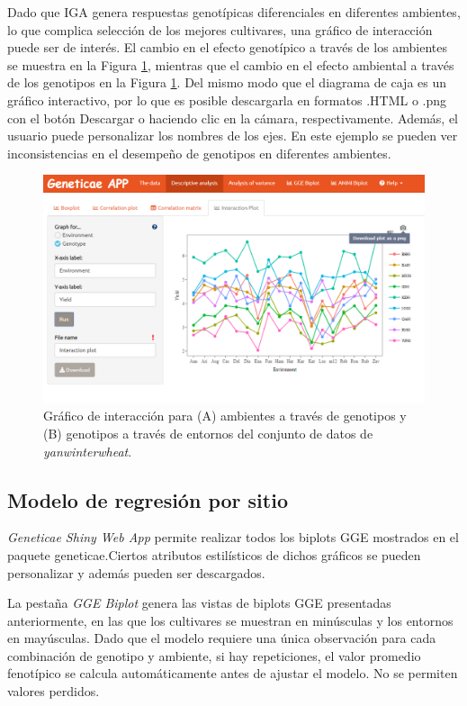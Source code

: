Dado que IGA genera respuestas genotípicas diferenciales en diferentes ambientes, lo que complica selección de los mejores cultivares, una gráfico de interacción puede ser de interés. El cambio en el efecto genotípico a través de los ambientes se muestra en la Figura \ref{fig:figdesc4}, mientras que el cambio en el efecto ambiental a través de los genotipos en la Figura \ref{fig:figdesc4}. Del mismo modo que el diagrama de caja es un gráfico interactivo, por lo que es posible descargarla en formatos .HTML o .png con el botón Descargar o haciendo clic en la cámara, respectivamente. Además, el usuario puede personalizar los nombres de los ejes. En este ejemplo se pueden ver inconsistencias en el desempeño de genotipos en diferentes ambientes. 


\begin{figure}[H]
	\begin{center}
		\includegraphics[width=16cm]{./Graficos/int_plot.png}
	\end{center}
	\caption{Gráfico de interacción para (A) ambientes a través de genotipos y (B) genotipos a través de entornos del conjunto de datos de \emph{yanwinterwheat}.}
	\label{fig:figdesc4}
\end{figure}


\subsection{Modelo de regresión por sitio}

\emph{Geneticae Shiny Web App} permite realizar todos los biplots GGE mostrados en el paquete geneticae.Ciertos atributos estilísticos de dichos gráficos se pueden personalizar y además pueden ser descargados.

La pestaña \emph{GGE Biplot} genera las vistas de biplots GGE presentadas anteriormente, en las que los cultivares se muestran en minúsculas y los entornos en mayúsculas. Dado que el modelo requiere una única observación para cada combinación de genotipo y ambiente, si hay repeticiones, el valor promedio fenotípico se calcula automáticamente antes de ajustar el modelo. No se permiten valores perdidos.

